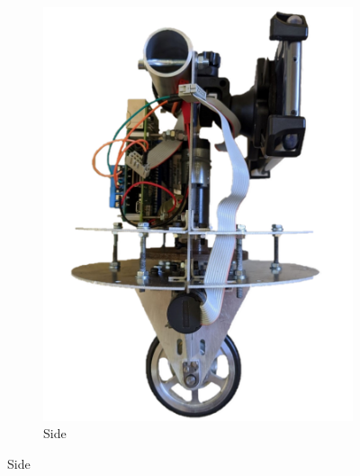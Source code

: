 \documentclass[twoside,twocolumn,12pt]{article}
\begin{document}
\begin{figure}
\begin{subfigure}[t]{0.49\textwidth}
    \includegraphics[width=\linewidth]{sidenewt}
    \caption{Side}
  \label{sub:sidenew}
  \end{subfigure}
  \newline




\end{figure}
\end{document}
